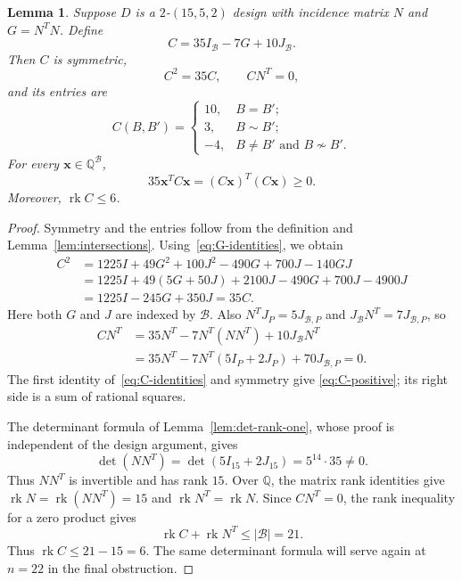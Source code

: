 \documentclass[11pt]{article}
\newcommand\cB{{\mathcal B}}
\newcommand\rats{{\mathbb Q}}
\newcommand\Zx{{\mathbf x}}
\newcommand\opk[1]{\mathop{\mathrm{#1}}\nolimits}
\newcommand\rk{\opk{rk}}
\newtheorem{lemma}[theorem]{Lemma}
\theoremstyle{definition}
\begin{document}
\begin{lemma}\label{lem:Connor}
Suppose $D$ is a $2$-$(15,5,2)$ design with incidence matrix $N$ and
$G=N^TN$. Define
\begin{equation}\label{eq:C-definition}
 C=35I_{\cB}-7G+10J_{\cB}.
\end{equation}
Then $C$ is symmetric,
\begin{equation}\label{eq:C-identities}
 C^2=35C,\qquad CN^T=0,
\end{equation}
and its entries are
\begin{equation}\label{eq:C-entries}
 C(B,B')=
 \begin{cases}
 10,&B=B';\\
 3,&B\sim B';\\
 -4,&B\ne B'\text{ and }B\not\sim B'.
 \end{cases}
\end{equation}
For every $\Zx\in\rats^{\cB}$,
\begin{equation}\label{eq:C-positive}
 35\Zx^TC\Zx=(C\Zx)^T(C\Zx)\ge0.
\end{equation}
Moreover, $\rk C\le6$.
\end{lemma}
\begin{proof}
Symmetry and the entries follow from the definition and
Lemma~\ref{lem:intersections}. Using~\eqref{eq:G-identities}, we obtain
\[
\begin{aligned}
 C^2
 &=1225I+49G^2+100J^2-490G+700J-140GJ\\
 &=1225I+49(5G+50J)+2100J-490G+700J-4900J\\
 &=1225I-245G+350J=35C.
\end{aligned}
\]
Here both $G$ and $J$ are indexed by $\cB$.
Also $N^TJ_P=5J_{\cB,P}$ and $J_{\cB}N^T=7J_{\cB,P}$, so
\[
\begin{aligned}
 CN^T
 &=35N^T-7N^T(NN^T)+10J_{\cB}N^T\\
 &=35N^T-7N^T(5I_P+2J_P)+70J_{\cB,P}=0.
\end{aligned}
\]
The first identity of~\eqref{eq:C-identities} and symmetry give
\eqref{eq:C-positive}; its right side is a sum of rational squares.

The determinant formula of Lemma~\ref{lem:det-rank-one}, whose proof
is independent of the design argument, gives
\[
 \det(NN^T)=\det(5I_{15}+2J_{15})=5^{14}\cdot35\ne0.
\]
Thus $NN^T$ is invertible and has rank $15$. Over $\rats$, the
matrix rank identities give $\rk N=\rk(NN^T)=15$ and
$\rk N^T=\rk N$. Since $CN^T=0$, the rank inequality for a zero
product gives
\[
 \rk C+\rk N^T\le|\cB|=21.
\]
Thus $\rk C\le21-15=6$. The same determinant formula will serve
again at $n=22$ in the final obstruction.
\end{proof}
\end{document}
